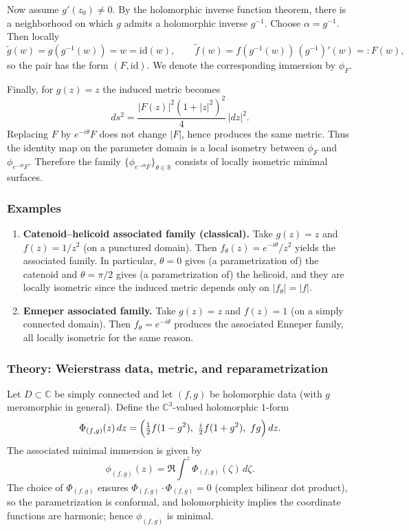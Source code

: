 \documentclass[12pt,a4paper]{article}
\theoremstyle{plain}
\theoremstyle{definition}      %
\begin{document}
Now assume $g'(z_0)\neq 0$. By the holomorphic inverse function theorem, there is a neighborhood on which $g$ admits a
holomorphic inverse $g^{-1}$. Choose $\alpha=g^{-1}$. Then locally
\[
\tilde g(w)=g(g^{-1}(w))=w=\mathrm{id}(w),
\qquad
\tilde f(w)= f(g^{-1}(w))\,(g^{-1})'(w)=:F(w),
\]
so the pair has the form $(F,\mathrm{id})$. We denote the corresponding immersion by $\phi_F$.

Finally, for $g(z)=z$ the induced metric becomes
\[
ds^2=\frac{|F(z)|^2(1+|z|^2)^2}{4}\,|dz|^2.
\]
Replacing $F$ by $e^{-i\theta}F$ does not change $|F|$, hence produces the same metric. Thus the identity map on the
parameter domain is a local isometry between $\phi_F$ and $\phi_{e^{-i\theta}F}$. Therefore the family
$\{\phi_{e^{-i\theta}F}\}_{\theta\in\mathbb{R}}$ consists of locally isometric minimal surfaces.

\medskip

\subsubsection*{Examples}
\begin{enumerate}
	\item \textbf{Catenoid--helicoid associated family (classical).}
	Take $g(z)=z$ and $f(z)=1/z^2$ (on a punctured domain). Then $f_\theta(z)=e^{-i\theta}/z^2$ yields the associated family.
	In particular, $\theta=0$ gives (a parametrization of) the catenoid and $\theta=\pi/2$ gives (a parametrization of) the
	helicoid, and they are locally isometric since the induced metric depends only on $|f_\theta|=|f|$.
	
	\item \textbf{Enneper associated family.}
	Take $g(z)=z$ and $f(z)=1$ (on a simply connected domain). Then $f_\theta=e^{-i\theta}$ produces the associated Enneper
	family, all locally isometric for the same reason.
\end{enumerate}

\medskip

\subsubsection*{Theory: Weierstrass data, metric, and reparametrization}
Let $D\subset\mathbb C$ be simply connected and let $(f,g)$ be holomorphic data (with $g$ meromorphic in general).
Define the $\mathbb C^3$-valued holomorphic $1$-form
\[
\Phi_{(f,g)}(z)\,dz
=
\Bigl(\tfrac12 f(1-g^2),\ \tfrac{i}{2}f(1+g^2),\ fg\Bigr)\,dz.
\]
The associated minimal immersion is given by
\[
\phi_{(f,g)}(z)=\Re\int^z \Phi_{(f,g)}(\zeta)\,d\zeta.
\]
The choice of $\Phi_{(f,g)}$ ensures $\Phi_{(f,g)}\cdot\Phi_{(f,g)}=0$ (complex bilinear dot product), so the parametrization is
conformal, and holomorphicity implies the coordinate functions are harmonic; hence $\phi_{(f,g)}$ is minimal.
\end{document}
